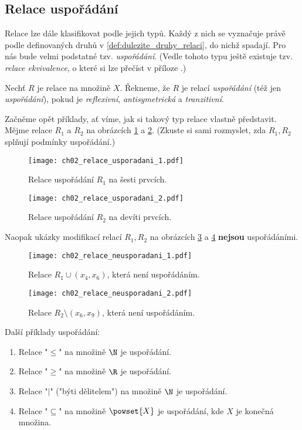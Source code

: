 \subsection{Relace uspořádání}\label{subsec:relace_usporadani}
Relace lze dále klasifikovat podle jejich typů. Každý z nich se vyznačuje právě podle definovaných druhů v \ref{def:dulezite_druhy_relaci}, do nichž spadají. Pro nás bude velmi podstatné tzv. \emph{uspořádání}. (Vedle tohoto typu ještě existuje tzv. \emph{relace ekvivalence}, o které si lze přečíst v příloze .)
\begin{definition}[Uspořádání]\label{def:usporadani}
    Nechť $R$ je relace na množině $X$. Řekneme, že $R$ je relací \emph{uspořádání} (též jen \emph{uspořádání}), pokud je \emph{reflexivní}, \emph{antisymetrická} a \emph{tranzitivní}.
\end{definition}
Začněme opět příklady, ať víme, jak si takový typ relace vlastně představit. Mějme relace $R_1$ a $R_2$ na obrázcích \ref{fig:relace_usporadani_1} a \ref{fig:relace_usporadani_2}. (Zkuste si sami rozmyslet, zda $R_1,R_2$ splňují podmínky uspořádání.)
\begin{figure}[H]
    \centering
    \texttt{[image: ch02\_relace\_usporadani\_1.pdf]}
    \caption{Relace uspořádání $R_1$ na šesti prvcích.}
    \label{fig:relace_usporadani_1}
\end{figure}
\begin{figure}[H]
    \centering
    \texttt{[image: ch02\_relace\_usporadani\_2.pdf]}
    \caption{Relace uspořádání $R_2$ na devíti prvcích.}
    \label{fig:relace_usporadani_2}
\end{figure}
Naopak ukázky modifikací relací $R_1,R_2$ na obrázcích \ref{fig:relace_neusporadani_1} a \ref{fig:relace_neusporadani_2} \textbf{nejsou} uspořádáními.
\begin{figure}[H]
    \centering
    \texttt{[image: ch02\_relace\_neusporadani\_1.pdf]}
    \caption{Relace $R_1\cup (x_4,x_6)$, která není uspořádáním.}
    \label{fig:relace_neusporadani_1}
\end{figure}
\begin{figure}[H]
    \centering
    \texttt{[image: ch02\_relace\_neusporadani\_2.pdf]}
    \caption{Relace $R_2\setminus (x_6,x_9)$, která není uspořádáním.}
    \label{fig:relace_neusporadani_2}
\end{figure}
\begin{example}
    Další příklady uspořádání:
    \begin{enumerate}[label=(\roman*)]
        \item Relace "$\leq$" na množině $\N$ je uspořádání.
        \item Relace "$\geq$" na množině $\R$ je uspořádání.
        \item Relace "$\mid$" ("býti dělitelem") na množině $\N$ je uspořádání.
        \item Relace "$\subseteq$" na množině $\powset{X}$ je uspořádání, kde $X$ je konečná množina.
    \end{enumerate}
\end{example}
